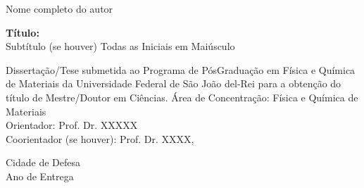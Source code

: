 \documentclass[
	12pt,			%
	oneside,
	a4paper,		%
	english,		%
	brazil,			%
	]{article}
\numberwithin{equation}{section}
\begin{document}

\thispagestyle{empty}
\newpage
\begin{center}

\vspace*{-1cm}

{\fontsize{14}{0} \selectfont Nome completo do autor}

\vspace{6cm}


{\fontsize{14}{0} \selectfont \textbf{Título:} \\
\vspace{0.15cm}
Subtítulo (se houver) Todas as Iniciais em Maiúsculo}
\\

\vspace{6cm}

\begin{flushright}
\begin{minipage}[b][4.5cm][c]{9.7cm}	%
Dissertação/Tese submetida ao Programa de PósGraduação em Física e Química de Materiais da Universidade Federal de São João del-Rei para a obtenção do título de Mestre/Doutor em Ciências. Área
de Concentração: Física e Química de Materiais\\
Orientador:  Prof. Dr. XXXXX\\
Coorientador (se houver): Prof. Dr. XXXX,
\end{minipage}
\end{flushright}

\vfill

{\fontsize{12}{0} \selectfont Cidade de Defesa}\\
{\fontsize{12}{0} \selectfont Ano de Entrega}
\thispagestyle{empty}
\end{center}
\end{document}
